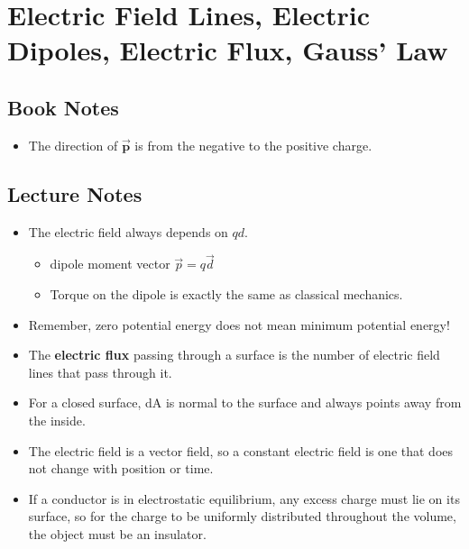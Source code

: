 \documentclass[11pt]{article}
\newcommand{\chapterTitle}{Electric Field Lines, Electric Dipoles, Electric Flux, Gauss’ Law}
\begin{document}
\section{\chapterTitle}

\subsection{Book Notes}
\begin{itemize}
    \item The direction of $\mathbf{\vec{p}}$ is from the negative to the positive charge.
\end{itemize}

\subsection{Lecture Notes}
\begin{itemize}
    \item The electric field always depends on $qd$.
    \begin{itemize}
        \item dipole moment vector $\vec{p} = q\vec{d}$
        \item Torque on the dipole is exactly the same as classical mechanics.
    \end{itemize}
    \item Remember, zero potential energy does not mean minimum potential energy!
    \item The \textbf{electric flux} passing through a surface is the number of electric field lines that pass through it.
    \item For a closed surface, dA is normal to the surface and always points away from the inside.
    \item The electric field is a vector field, so a constant electric field is one that does not change with position or time.
    \item If a conductor is in electrostatic equilibrium, any excess charge must lie on its surface, so for the charge to be uniformly distributed throughout the volume, the object must be an insulator.
\end{itemize}
\end{document}
